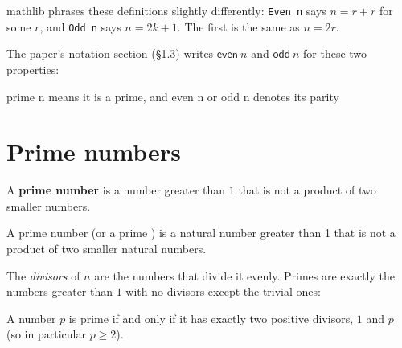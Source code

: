\bpush\begin{bremark}

mathlib phrases these definitions slightly differently: \texttt{Even\ n}
says \(n = r + r\) for some \(r\), and \texttt{Odd\ n} says
\(n = 2k + 1\). The first is the same as \(n = 2r\).

\end{bremark}\bpop

\bpush\begin{binpaper}

The paper's notation section (§1.3) writes \(\mathsf{even}\ n\) and
\(\mathsf{odd}\ n\) for these two properties:

\bpush\begin{bquote}

prime n means it is a prime, and
even n or odd n denotes its parity

\end{bquote}\bpop

\end{binpaper}\bpop

\hypertarget{prime-numbers}{%
\section{Prime numbers}\label{prime-numbers}}

\bpush\begin{bdefinition}\label{def-prime}


A \textbf{prime number} is a number greater than \(1\) that is not a
product of two smaller numbers.

\end{bdefinition}\bpop

\bpush\begin{bquote}

A prime number (or a prime ) is a
natural number greater than 1 that is not a product of two smaller
natural numbers.

\end{bquote}\bpop

The
\emph{divisors} of \(n\) are the numbers that divide it evenly. Primes
are exactly the numbers greater than \(1\) with no divisors except the
trivial ones:

\bpush\begin{bproposition}\label{prop-prime-divisors}

A number \(p\) is prime if and only if it has exactly two positive
divisors, \(1\) and \(p\) (so in particular \(p \ge 2\)).

\end{bproposition}\bpop

